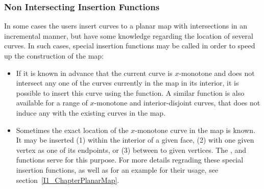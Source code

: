 
\subsubsection{Non Intersecting Insertion Functions}

In some cases the users insert curves to a planar map with intersections
in an incremental manner, but have some knowledge regarding the location
of several curves. In such cases, special insertion functions may be called
in order to speed up the construction of the map:
\begin{itemize}
\item If it is known in advance that the current curve is $x$-monotone and does
not intersect any one of the curves currently in the map in its interior,
it is possible to insert this curve using the 
function. A similar function is also available for a range of $x$-monotone
and interior-disjoint curves, that does not induce any
 with the existing curves in the map.
\item Sometimes the exact location of the $x$-monotone curve in the map is known. It may be inserted (1) within the interior of a given face, (2) with one given vertex as one of its endpoints, or (3) between to given vertices. The ,  and  functions serve for this purpose. For more details regrading these special insertion functions, as well as for an example for their usage, see section~\ref{I1_ChapterPlanarMap}.
\end{itemize}

